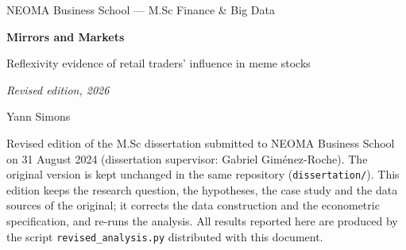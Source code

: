 \documentclass[11pt,a4paper]{article}
\begin{document}
\begin{titlepage}
\centering
\vspace*{2.5cm}
{\small NEOMA Business School --- M.Sc Finance \& Big Data\par}
\vspace{1.8cm}
{\LARGE\bfseries Mirrors and Markets\par}
\vspace{0.5cm}
{\large Reflexivity evidence of retail traders' influence in meme stocks\par}
\vspace{1.2cm}
{\large\itshape Revised edition, 2026\par}
\vspace{2cm}
{\Large Yann Simons\par}
\vfill
\begin{minipage}{0.86\textwidth}
\small
Revised edition of the M.Sc dissertation submitted to NEOMA Business School on
31 August 2024 (dissertation supervisor: Gabriel Giménez-Roche). The original
version is kept unchanged in the same repository (\texttt{dissertation/}). This
edition keeps the research question, the hypotheses, the case study and the data
sources of the original; it corrects the data construction and the econometric
specification, and re-runs the analysis. All results reported here are produced
by the script \texttt{revised\_analysis.py} distributed with this document.
\end{minipage}
\vspace{1.5cm}
\end{titlepage}
\end{document}

